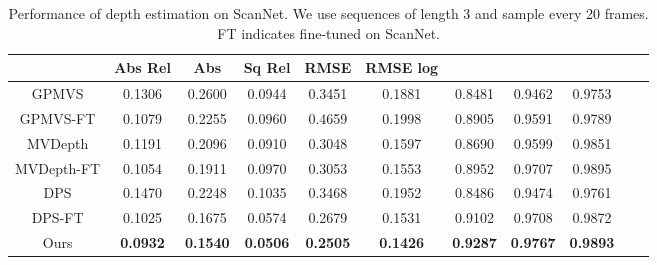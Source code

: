\documentclass[runningheads]{llncs}
\begin{document}
\begin{table}[t]
  \caption{Performance of depth estimation on ScanNet. We use sequences of length 3 and sample every 20 frames. FT indicates fine-tuned on ScanNet. }
  \centering
\begin{tabular}{ccccccccccc}
 \hline 
     &Abs Rel  &Abs & Sq Rel & RMSE & RMSE log & \textbf{}& \textbf{}& \textbf{}\\

    \hline
GPMVS &	0.1306 &0.2600  &  0.0944  & 0.3451 & 0.1881 & 0.8481 &  0.9462 &	0.9753	\\
GPMVS-FT  &  0.1079 & 0.2255 & 0.0960 & 0.4659 & 0.1998 & 0.8905 & 0.9591 & 0.9789 \\
MVDepth & 0.1191 & 0.2096 & 0.0910 & 0.3048 & 0.1597 & 0.8690 & 0.9599 & 0.9851 \\
MVDepth-FT & 0.1054 & 0.1911 & 0.0970 & 0.3053 & 0.1553& 0.8952 & 0.9707 & 0.9895  \\
DPS & 0.1470 & 0.2248 & 0.1035 & 0.3468& 0.1952 & 0.8486 & 0.9474 & 0.9761		 \\
DPS-FT &	0.1025 & 0.1675 & 0.0574 & 0.2679 & 0.1531 & 0.9102 & 0.9708 & 0.9872	\\
Ours &	\textbf{0.0932} & \textbf{0.1540} & \textbf{0.0506} & \textbf{0.2505} & \textbf{0.1426}& \textbf{0.9287} & \textbf{0.9767} & \textbf{0.9893} \\
\hline
  \end{tabular}
\label{table2}
\end{table}
\end{document}
